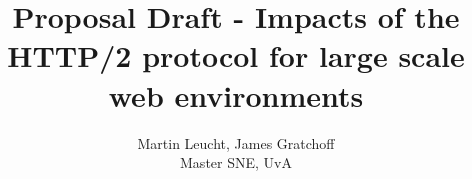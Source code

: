 \documentclass{article}
\begin{document}
 
\begin{figure}[!bh]
 	\begin{center}
		\huge \title{Proposal Draft - Impacts of the HTTP/2 protocol for large scale web environments}
		\author{Martin Leucht, James Gratchoff \\
		Master SNE, UvA} 
	\maketitle 
		\label{sec:uva}
	\end{center}
\end{figure}
\setlength{\columnsep}{2cm}
\def\columnseprulecolor{\color{blue}}
 









\begin{thebibliography}
\\
\end{thebibliography}
\newpage
\appendix
\end{document}
